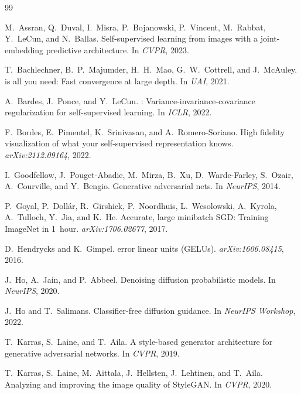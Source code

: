 \documentclass[12pt]{article}
\begin{document}

\begin{thebibliography}{99}

M.~Assran, Q.~Duval, I.~Misra, P.~Bojanowski, P.~Vincent, M.~Rabbat,
Y.~LeCun, and N.~Ballas.
\newblock Self-supervised learning from images with a joint-embedding
predictive architecture.
\newblock In \emph{CVPR}, 2023.

T.~Bachlechner, B.~P.~Majumder, H.~H.~Mao, G.~W.~Cottrell, and J.~McAuley.
 is all you need: Fast convergence at large depth.
\newblock In \emph{UAI}, 2021.

A.~Bardes, J.~Ponce, and Y.~LeCun.
: Variance-invariance-covariance regularization for
self-supervised learning.
\newblock In \emph{ICLR}, 2022.

F.~Bordes, E.~Pimentel, K.~Srinivasan, and A.~Romero-Soriano.
\newblock High fidelity visualization of what your self-supervised
representation knows.
\newblock \emph{arXiv:2112.09164}, 2022.

I.~Goodfellow, J.~Pouget-Abadie, M.~Mirza, B.~Xu, D.~Warde-Farley,
S.~Ozair, A.~Courville, and Y.~Bengio.
\newblock Generative adversarial nets.
\newblock In \emph{NeurIPS}, 2014.

P.~Goyal, P.~Doll{\'a}r, R.~Girshick, P.~Noordhuis, L.~Wesolowski,
A.~Kyrola, A.~Tulloch, Y.~Jia, and K.~He.
\newblock Accurate, large minibatch {SGD}: Training {ImageNet} in 1~hour.
\newblock \emph{arXiv:1706.02677}, 2017.

D.~Hendrycks and K.~Gimpel.
 error linear units ({GELUs}).
\newblock \emph{arXiv:1606.08415}, 2016.

J.~Ho, A.~Jain, and P.~Abbeel.
\newblock Denoising diffusion probabilistic models.
\newblock In \emph{NeurIPS}, 2020.

J.~Ho and T.~Salimans.
\newblock Classifier-free diffusion guidance.
\newblock In \emph{NeurIPS Workshop}, 2022.

T.~Karras, S.~Laine, and T.~Aila.
\newblock A style-based generator architecture for generative adversarial
networks.
\newblock In \emph{CVPR}, 2019.

T.~Karras, S.~Laine, M.~Aittala, J.~Hellsten, J.~Lehtinen, and T.~Aila.
\newblock Analyzing and improving the image quality of {StyleGAN}.
\newblock In \emph{CVPR}, 2020.


\end{thebibliography}
\end{document}
